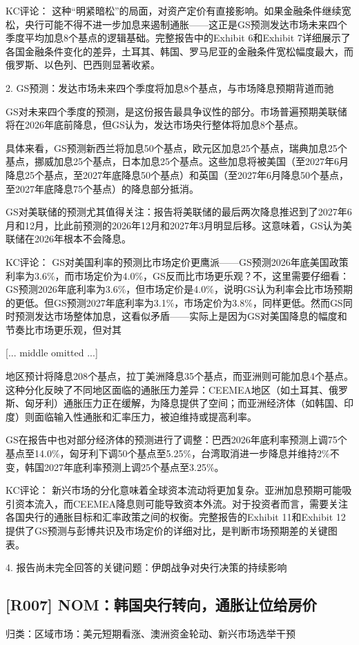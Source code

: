 \documentclass[11pt]{ctexart}
\begin{document}
KC评论： 这种“明紧暗松”的局面，对资产定价有直接影响。如果金融条件继续宽松，央行可能不得不进一步加息来遏制通胀——这正是GS预测发达市场未来四个季度平均加息8个基点的逻辑基础。完整报告中的Exhibit 6和Exhibit 7详细展示了各国金融条件变化的差异，土耳其、韩国、罗马尼亚的金融条件宽松幅度最大，而俄罗斯、以色列、巴西则显著收紧。

2. GS预测：发达市场未来四个季度将加息8个基点，与市场降息预期背道而驰

GS对未来四个季度的预测，是这份报告最具争议性的部分。市场普遍预期美联储将在2026年底前降息，但GS认为，发达市场央行整体将加息8个基点。

具体来看，GS预测新西兰将加息50个基点，欧元区加息25个基点，瑞典加息25个基点，挪威加息25个基点，日本加息25个基点。这些加息将被美国（至2027年6月降息25个基点，至2027年底降息50个基点）和英国（至2027年6月降息50个基点，至2027年底降息75个基点）的降息部分抵消。

GS对美联储的预测尤其值得关注：报告将美联储的最后两次降息推迟到了2027年6月和12月，比此前预测的2026年12月和2027年3月明显后移。这意味着，GS认为美联储在2026年根本不会降息。

KC评论： GS对美国利率的预测比市场定价更鹰派——GS预测2026年底美国政策利率为3.6\%，而市场定价为4.0\%，GS反而比市场更乐观？不，这里需要仔细看：GS预测2026年底利率为3.6\%，但市场定价是4.0\%，说明GS认为利率会比市场预期的更低。但GS预测2027年底利率为3.1\%，市场定价为3.8\%，同样更低。然而GS同时预测发达市场整体加息，这看似矛盾——实际上是因为GS对美国降息的幅度和节奏比市场更乐观，但对其

[... middle omitted ...]

地区预计将降息208个基点，拉丁美洲降息35个基点，而亚洲则可能加息4个基点。这种分化反映了不同地区面临的通胀压力差异：CEEMEA地区（如土耳其、俄罗斯、匈牙利）通胀压力正在缓解，为降息提供了空间；而亚洲经济体（如韩国、印度）则面临输入性通胀和汇率压力，被迫维持或提高利率。

GS在报告中也对部分经济体的预测进行了调整：巴西2026年底利率预测上调75个基点至14.0\%，匈牙利下调50个基点至5.25\%，台湾取消进一步降息并维持2\%不变，韩国2027年底利率预测上调25个基点至3.25\%。

KC评论： 新兴市场的分化意味着全球资本流动将更加复杂。亚洲加息预期可能吸引资本流入，而CEEMEA降息则可能导致资本外流。对于投资者而言，需要关注各国央行的通胀目标和汇率政策之间的权衡。完整报告的Exhibit 11和Exhibit 12提供了GS预测与彭博共识及市场定价的详细对比，是判断市场预期差的关键图表。

4. 报告尚未完全回答的关键问题：伊朗战争对央行决策的持续影响

\subsection{[R007] NOM：韩国央行转向，通胀让位给房价}
{\small\color{refgray}归类：区域市场：美元短期看涨、澳洲资金轮动、新兴市场选举干预}
\end{document}
